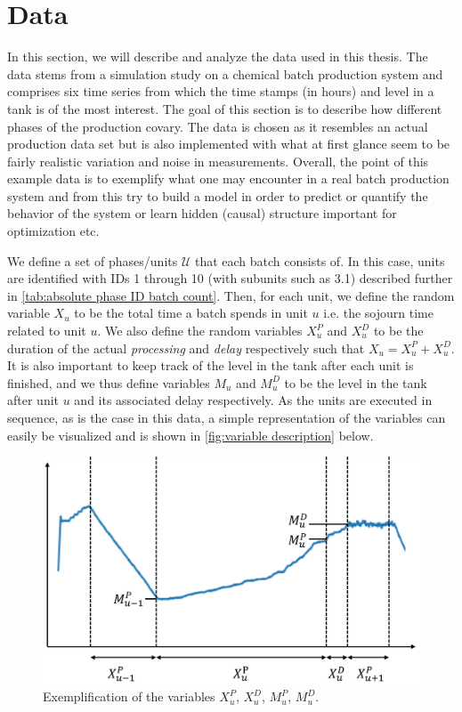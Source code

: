 \documentclass[../Thesis.tex]{subfiles}
\begin{document}
\chapter{Data}

In this section, we will describe and analyze the data used in this thesis. The data stems from a simulation study on a chemical batch production system and comprises six time series from which the time stamps (in hours) and level in a tank is of the most interest. The goal of this section is to describe how different phases of the production covary. The data is chosen as it resembles an actual production data set but is also implemented with what at first glance seem to be fairly realistic variation and noise in measurements. Overall, the point of this example data is to exemplify what one may encounter in a real batch production system and from this try to build a model in order to predict or quantify the behavior of the system or learn hidden (causal) structure important for optimization etc. 

We define a set of phases/units $\mathcal{U}$ that each batch consists of. In this case, units are identified with IDs 1 through 10 (with subunits such as 3.1) described further in \autoref{tab:absolute phase ID batch count}. Then, for each unit, we define the random variable $X_u$ to be the total time a batch spends in unit $u$ i.e. the sojourn time related to unit $u$. We also define the random variables $X_u^P$ and $X^D_u$ to be the duration of the actual \textit{processing} and \textit{delay} respectively such that $X_{u} = X_u^P + X_u^D$. It is also important to keep track of the level in the tank after each unit is finished, and we thus define variables $M_u$ and $M^D_u$ to be the level in the tank after unit $u$ and its associated delay respectively. As the units are executed in sequence, as is the case in this data, a simple representation of the variables can easily be visualized and is shown in \autoref{fig:variable description} below.

\begin{figure}[h]
    \centering
    \includegraphics[width=.7\linewidth]{figures/Multiple cycles data/variable desciption.png}
    \caption{Exemplification of the variables $X_u^P$, $X^D_u$, $M_u^P$, $M^D_u$.}
    \label{fig:variable description}
\end{figure}
\end{document}
